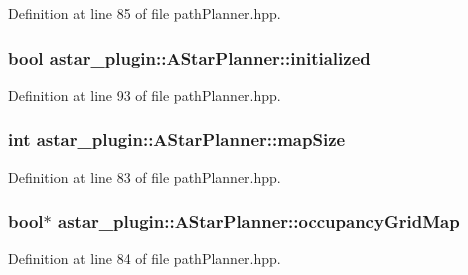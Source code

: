 Definition at line 85 of file path\+Planner.\+hpp.

\subsubsection[{\texorpdfstring{initialized}{initialized}}]{\setlength{\rightskip}{0pt plus 5cm}bool astar\+\_\+plugin\+::\+A\+Star\+Planner\+::initialized}\hypertarget{classastar__plugin_1_1_a_star_planner_a3befa689d0be167cbde58b71c635f5ae}{}\label{classastar__plugin_1_1_a_star_planner_a3befa689d0be167cbde58b71c635f5ae}


Definition at line 93 of file path\+Planner.\+hpp.

\subsubsection[{\texorpdfstring{map\+Size}{mapSize}}]{\setlength{\rightskip}{0pt plus 5cm}int astar\+\_\+plugin\+::\+A\+Star\+Planner\+::map\+Size}\hypertarget{classastar__plugin_1_1_a_star_planner_a5edf65eab6aa9be80520ebbcaa9e6704}{}\label{classastar__plugin_1_1_a_star_planner_a5edf65eab6aa9be80520ebbcaa9e6704}


Definition at line 83 of file path\+Planner.\+hpp.

\subsubsection[{\texorpdfstring{occupancy\+Grid\+Map}{occupancyGridMap}}]{\setlength{\rightskip}{0pt plus 5cm}bool$\ast$ astar\+\_\+plugin\+::\+A\+Star\+Planner\+::occupancy\+Grid\+Map}\hypertarget{classastar__plugin_1_1_a_star_planner_a205a9cf7b62779627bf89c8b0d78f391}{}\label{classastar__plugin_1_1_a_star_planner_a205a9cf7b62779627bf89c8b0d78f391}


Definition at line 84 of file path\+Planner.\+hpp.

